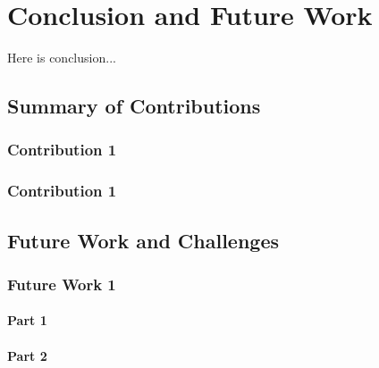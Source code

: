 \chapter{Conclusion and Future Work}
\label{sec-conclusion}

Here is conclusion...

\section{Summary of Contributions}



\subsection{Contribution 1}

\subsection{Contribution 1}
\label{maqbool}

\section{Future Work and Challenges}

\subsection{Future Work 1} 

\subsubsection{Part 1} 

\subsubsection{Part 2} 
